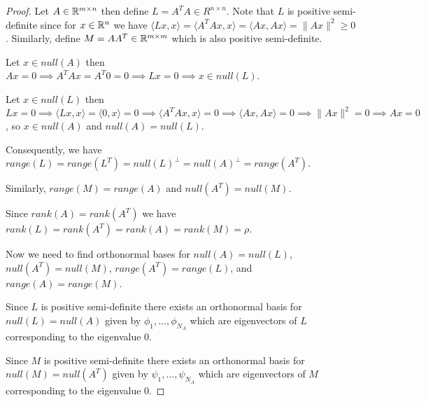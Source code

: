 \begin{proof}

\item Let $A \in \Bbb R^{m \times n}$ then define $L = A^{T}A \in R^{n \times n}$. Note that $L$ is positive semi-definite since for $x \in \Bbb R^n$ we have $\langle Lx, x \rangle = \langle A^{T}Ax, x \rangle = \langle Ax, Ax \rangle = \|Ax\|^2 \geq 0$. Similarly, define $M = AA^T \in \Bbb R^{m \times m}$ which is also positive semi-definite.

\item Let $x \in \mathit{null}(A)$ then $Ax = 0 \implies A^{T}Ax = A^{T}0 = 0 \implies Lx = 0 \implies x \in \mathit{null}(L)$.

\item Let $x \in \mathit{null}(L)$ then $Lx = 0 \implies \langle Lx, x \rangle = \langle 0, x \rangle = 0 \implies \langle A^{T}Ax, x \rangle = 0 \implies \langle Ax, Ax \rangle = 0 \implies \|Ax\|^2 = 0 \implies Ax = 0$, so $x \in \mathit{null}(A)$ and $\mathit{null}(A) = \mathit{null}(L)$.

\item Consequently, we have $\mathit{range}(L) = \mathit{range}(L^T) = \mathit{null}(L)^{\perp} = \mathit{null}(A)^{\perp} = \mathit{range}(A^T)$.

\item Similarly, $\mathit{range}(M) = \mathit{range}(A)$ and $\mathit{null}(A^T) = \mathit{null}(M)$.

\item Since $\mathit{rank}(A) = \mathit{rank}(A^T)$ we have $\mathit{rank}(L) = \mathit{rank}(A^T) = \mathit{rank}(A) = \mathit{rank}(M) = \rho$.


\item Now we need to find orthonormal bases for $\mathit{null}(A) = \mathit{null}(L)$, $\mathit{null}(A^T) = \mathit{null}(M)$, $\mathit{range}(A^T) = \mathit{range}(L)$, and $\mathit{range}(A) = \mathit{range}(M)$.

\item Since $L$ is positive semi-definite there exists an orthonormal basis for $\mathit{null}(L) = \mathit{null}(A)$ given by $\phi_1, ..., \phi_{N_A}$ which are eigenvectors of $L$ corresponding to the eigenvalue $0$.

\item Since $M$ is positive semi-definite there exists an orthonormal basis for $\mathit{null}(M) = \mathit{null}(A^T)$ given by $\psi_1, ..., \psi_{N_A}$ which are eigenvectors of $M$ corresponding to the eigenvalue $0$.


\end{proof}
